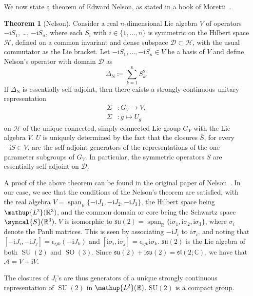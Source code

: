 \documentclass[12pt, a4 paper]{article}
\theoremstyle{definition}
\newtheorem{thm}{Theorem}
\newcommand{\ltwo}{\mathup{L\kern-0.7pt^2}}
\newcommand{\ltworthree}{\ltwo(\rr^3)}
\newcommand{\rr}{\mathbb{R}}
\newcommand{\cc}{\mathbb{C}}
\newcommand{\hilbert}{\mathcal{H}}
\newcommand{\ltwor}{\ltwo(\rr)}
\newcommand{\schwartz}{\symcal{S}}
\newcommand{\schwartzrthree}{\schwartz(\rr^3)}
\renewcommand{\i}{\mathrm{i}}
\newcommand{\domain}{\mathcal{D}}
\DeclareMathOperator{\spann}{span}
\newcommand{\sutwo}{\mathfrak{su}(2)}
\newcommand{\sltwoc}{\mathfrak{sl}(2;\cc)}
\begin{document}
	We now state a theorem of Edward Nelson, as stated in a book of Moretti~\cite[p.~291]{MorettiFundamental}.
	\begin{thm}[Nelson]
		Consider a real \(n\)-dimensional Lie algebra \(V\) of operators \(-\i S_1\), \ldots, \(-\i S_n\), where each \(S_i\) with \(i \in \{1, \ldots, n\}\) is symmetric on the Hilbert space \(\hilbert\), defined on a common invariant and dense subspace \(\domain \subset \hilbert\), with the usual commutator as the Lie bracket.
		Let \(-\i S_1, \ldots, -\i S_n \in V\) be a basis of \(V\) and define Nelson's operator with domain \(\domain\) as
		\[
			\Delta_{\mathrm{N}} \coloneq \sum_{k=1}^{n} S_k^2.
		\]
		If \(\Delta_{\mathrm{N}}\) is essentially self-adjoint, then there exists a strongly-continuous unitary representation
		\begin{align*}
		    \Sigma &\colon G_V \rightarrow V,\\
			\Sigma &\colon g \mapsto U_g
		\end{align*}
		on \(\hilbert\) of the unique connected, simply-connected Lie group \(G_V\) with the Lie algebra \(V\).
		\(U\) is uniquely determined by the fact that the closures \(\overline{S}\), for every \(-\i S \in V\), are the self-adjoint generators of the representations of the one-parameter subgroups of \(G_V\). In particular, the symmetric operators \(S\) are essentially self-adjoint on \(\domain\).
	\end{thm}
	A proof of the above theorem can be found in the original paper of Nelson~\cite{Nelson}. In our case, we see that the conditions of the Nelson's theorem are satisfied, with the real algebra \(V = \spann_{\rr}\{-\i J_1, -\i J_2, -\i J_3\}\), the Hilbert space being \(\ltworthree\), and the common domain or core  being the Schwartz space \(\schwartzrthree\). \(V\) is isomorphic to \(\sutwo = \spann_{\rr}\{\i\sigma_1, \i\sigma_2, \i\sigma_3\}\), where \(\sigma_i\) denote the Pauli matrices. This is seen by associating \(-\i J_i\) to \(i\sigma_i\), and noting that \([-\i J_i, -\i J_j] = \epsilon_{ijk}(-\i J_k)\) and \([\i\sigma_i, \i\sigma_j] = \epsilon_{ijk}\i\sigma_k\). \(\sutwo\) is the Lie algebra of both \(\operatorname{SU}(2)\) and \(\operatorname{SO}(3)\). Since \(\sutwo + \i \sutwo = \sltwoc\), we have that \(\mathcal{A} = V + \i V\).

	The closures of \(J_i\)'s are thus generators of a unique strongly continuous representation of \(\operatorname{SU}(2)\) in \(\ltwor\). \(\operatorname{SU(2)}\) is a compact group.
\end{document}
